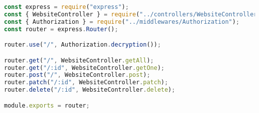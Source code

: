 \begin{lstlisting}[language=Javascript,caption={website Route}]
const express = require("express");
const { WebsiteController } = require("../controllers/WebsiteController");
const { Authorization } = require("../middlewares/Authorization");
const router = express.Router();

router.use("/", Authorization.decryption());

router.get("/", WebsiteController.getAll);
router.get("/:id", WebsiteController.getOne);
router.post("/", WebsiteController.post);
router.patch("/:id", WebsiteController.patch);
router.delete("/:id", WebsiteController.delete);

module.exports = router;
\end{lstlisting}